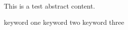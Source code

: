 \documentclass[degree=master, academic=true, fontset=fandol]{nwputhesis}
\begin{document}
\START
\showoutput

\frontmatter

\begin{abstract}
    这是测试摘要内容。
    \begin{keywords}
        关键词一 \sep 关键词二 \sep 关键词三
    \end{keywords}
\end{abstract}

\begin{engabstract}
    This is a test abstract content.
    \begin{engkeywords}
        keyword one \ensep keyword two \ensep keyword three
    \end{engkeywords}
\end{engabstract}

\clearpage
\OMIT
\end{document}
